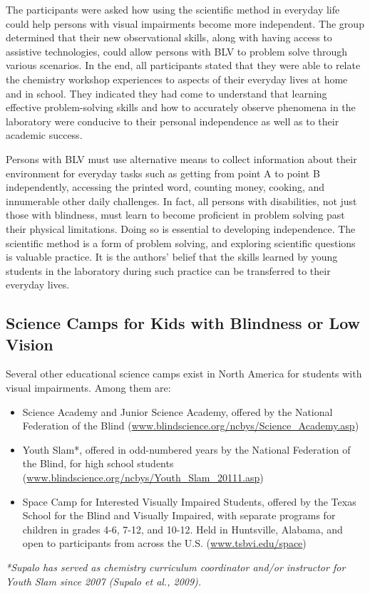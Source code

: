 \documentclass[11.5pt]{sig-alternate} %
\begin{document}
\begin{large}
The participants were asked how using the scientific method in everyday life could help persons with visual impairments become more independent. The group determined that their new observational skills, along with having access to assistive technologies, could allow persons with BLV to problem solve through various scenarios. In the end, all participants stated that they were able to relate the chemistry workshop experiences to aspects of their everyday lives at home and in school. They indicated they had come to understand that learning effective problem-solving skills and how to accurately observe phenomena in the laboratory were conducive to their personal independence as well as to their academic success.

Persons with BLV must use alternative means to collect information about their environment for everyday tasks such as getting from point A to point B independently, accessing the printed word, counting money, cooking, and innumerable other daily challenges. In fact, all persons with disabilities, not just those with blindness, must learn to become proficient in problem solving past their physical limitations. Doing so is essential to developing independence. The scientific method is a form of problem solving, and exploring scientific questions is valuable practice. It is the authors’ belief that the skills learned by young students in the laboratory during such practice can be transferred to their everyday lives.

\subsection*{Science Camps for Kids with Blindness or Low Vision}
Several other educational science camps exist in North America for students with visual impairments. Among them are:
\begin{itemize}
    \item Science Academy and Junior Science Academy, offered by the National Federation of the Blind (\url{www.blindscience.org/ncbys/Science_Academy.asp})
    \item Youth Slam*, offered in odd-numbered years by the National Federation of the Blind, for high school students (\url{www.blindscience.org/ncbys/Youth_Slam_20111.asp})
    \item Space Camp for Interested Visually Impaired Students, offered by the Texas School for the Blind and Visually Impaired, with separate programs for children in grades 4-6, 7-12, and 10-12. Held in Huntsville, Alabama, and open to participants from across the U.S. (\url{www.tsbvi.edu/space})
\end{itemize}
\textit{*Supalo has served as chemistry curriculum coordinator and/or instructor for Youth Slam since 2007 (Supalo et al., 2009).}


\end{large}
\end{document}
